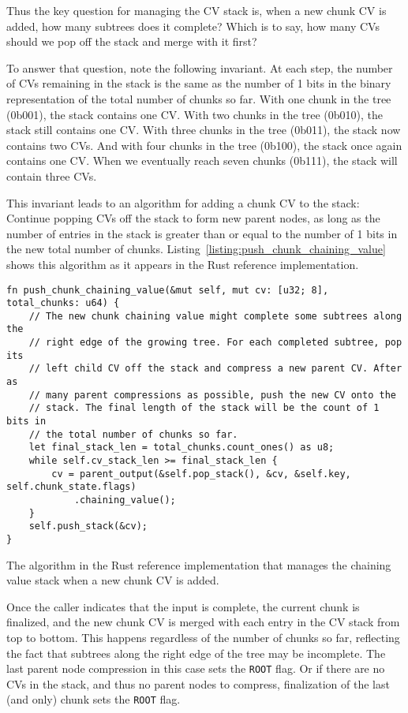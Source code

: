 \documentclass[11pt,notitlepage,a4paper]{article}
\begin{document}
Thus the key question for managing the CV stack is, when a new chunk CV is
added, how many subtrees does it complete? Which is to say, how many CVs should
we pop off the stack and merge with it first?

To answer that question, note the following invariant. At each step, the number
of CVs remaining in the stack is the same as the number of 1 bits in the binary
representation of the total number of chunks so far. With one chunk in the tree
(0b001), the stack contains one CV. With two chunks in the tree (0b010), the
stack still contains one CV. With three chunks in the tree (0b011), the stack
now contains two CVs. And with four chunks in the tree (0b100), the stack once
again contains one CV. When we eventually reach seven chunks (0b111), the stack
will contain three CVs.

This invariant leads to an algorithm for adding a chunk CV to the stack:
Continue popping CVs off the stack to form new parent nodes, as long as the
number of entries in the stack is greater than or equal to the number of 1 bits
in the new total number of chunks.
Listing~\ref{listing:push_chunk_chaining_value} shows this algorithm as it
appears in the Rust reference implementation.

\begin{listing}[h]
\begin{verbatim}
fn push_chunk_chaining_value(&mut self, mut cv: [u32; 8], total_chunks: u64) {
    // The new chunk chaining value might complete some subtrees along the
    // right edge of the growing tree. For each completed subtree, pop its
    // left child CV off the stack and compress a new parent CV. After as
    // many parent compressions as possible, push the new CV onto the
    // stack. The final length of the stack will be the count of 1 bits in
    // the total number of chunks so far.
    let final_stack_len = total_chunks.count_ones() as u8;
    while self.cv_stack_len >= final_stack_len {
        cv = parent_output(&self.pop_stack(), &cv, &self.key, self.chunk_state.flags)
            .chaining_value();
    }
    self.push_stack(&cv);
}
\end{verbatim}
\caption{The algorithm in the Rust reference implementation that manages the
    chaining value stack when a new chunk CV is added.}
\label{listing:push_chunk_chaining_value}
\end{listing}

Once the caller indicates that the input is complete, the current chunk is
finalized, and the new chunk CV is merged with each entry in the CV stack from
top to bottom. This happens regardless of the number of chunks so far,
reflecting the fact that subtrees along the right edge of the tree may be
incomplete. The last parent node compression in this case sets the
\texttt{ROOT} flag. Or if there are no CVs in the stack, and thus no parent
nodes to compress, finalization of the last (and only) chunk sets the
\texttt{ROOT} flag.
\end{document}

